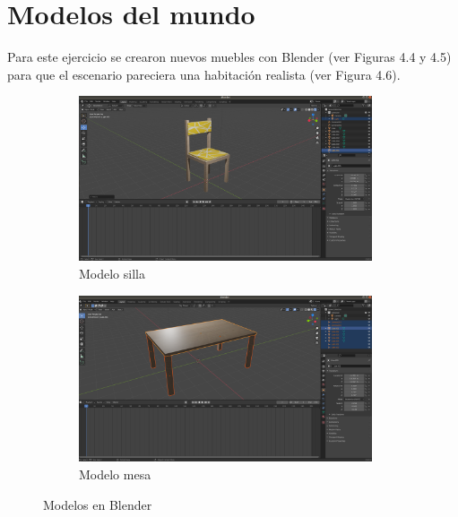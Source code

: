 \section{Modelos del mundo}
Para este ejercicio se crearon nuevos muebles con Blender (ver Figuras 4.4 y 4.5) para que el escenario pareciera una habitación realista (ver Figura 4.6).
\begin{figure}[H]
  \begin{subfigure}[b]{0.5\textwidth}
  \centering
    \includegraphics[width=0.95\textwidth, height=0.6\textwidth]{chapters/images/silla.png}
    \caption{Modelo silla}
    \label{fig:f1}
  \end{subfigure}
  \hfill
  \begin{subfigure}[b]{0.5\textwidth}
  \centering
    \includegraphics[width=0.95\textwidth, height=0.6\textwidth]{chapters/images/mesa.png}
	\caption{Modelo mesa}    
    \label{fig:f2}
 
  \end{subfigure}
  \caption{Modelos en Blender}
\end{figure}

